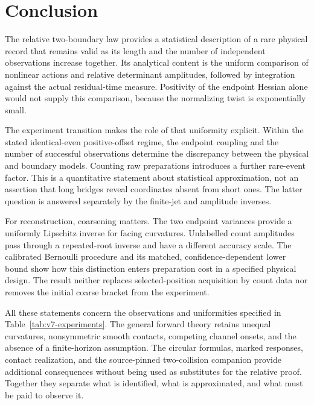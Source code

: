 \section{Conclusion}
\label{sec:v7-conclusion}
The relative two-boundary law provides a statistical description of a rare physical record that remains valid as its length and the number of independent observations increase together. Its analytical content is the uniform comparison of nonlinear actions and relative determinant amplitudes, followed by integration against the actual residual-time measure. Positivity of the endpoint Hessian alone would not supply this comparison, because the normalizing twist is exponentially small.

The experiment transition makes the role of that uniformity explicit. Within the stated identical-even positive-offset regime, the endpoint coupling and the number of successful observations determine the discrepancy between the physical and boundary models. Counting raw preparations introduces a further rare-event factor. This is a quantitative statement about statistical approximation, not an assertion that long bridges reveal coordinates absent from short ones. The latter question is answered separately by the finite-jet and amplitude inverses.

For reconstruction, coarsening matters. The two endpoint variances provide a uniformly Lipschitz inverse for facing curvatures. Unlabelled count amplitudes pass through a repeated-root inverse and have a different accuracy scale. The calibrated Bernoulli procedure and its matched, confidence-dependent lower bound show how this distinction enters preparation cost in a specified physical design. The result neither replaces selected-position acquisition by count data nor removes the initial coarse bracket from the experiment.

All these statements concern the observations and uniformities specified in Table~\ref{tab:v7-experiments}. The general forward theory retains unequal curvatures, nonsymmetric smooth contacts, competing channel onsets, and the absence of a finite-horizon assumption. The circular formulas, marked responses, contact realization, and the source-pinned two-collision companion provide additional consequences without being used as substitutes for the relative proof. Together they separate what is identified, what is approximated, and what must be paid to observe it.

